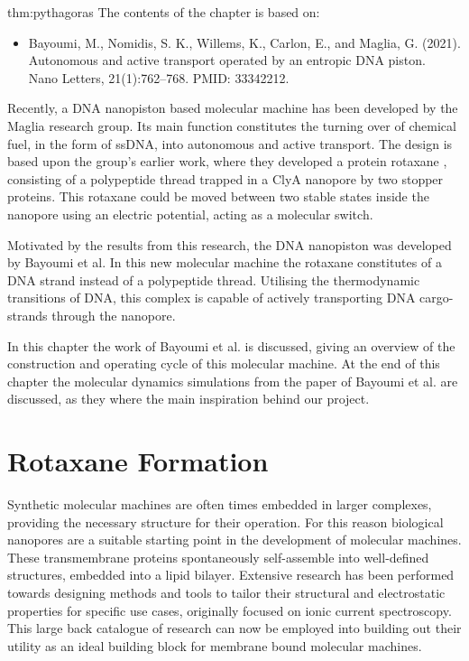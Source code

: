 
\begin{theo}{thm:pythagoras}
  The contents of the chapter is based on:
  \vspace{-0.4cm}
  \begin{itemize}
    \item Bayoumi, M., Nomidis, S. K., Willems, K., Carlon, E., and Maglia, G. (2021).
      Autonomous and active transport operated by an entropic DNA piston.\\
      Nano Letters, 21(1):762–768. PMID: 33342212.
  \end{itemize}
  \vspace{0.3cm}
\end{theo}

Recently, a DNA nanopiston based molecular machine has been developed by the Maglia
research group. Its main function constitutes the turning over of chemical fuel, in the
form of ssDNA, into autonomous and active transport. The design is based upon the group's
earlier work, where they developed a protein rotaxane \cite{Biesemans2015}, consisting of
a polypeptide thread trapped in
a ClyA nanopore by two stopper proteins. This rotaxane could be moved between two stable
states inside the nanopore using an electric potential, acting as a molecular switch.

Motivated by the results from this research, the DNA nanopiston was developed by Bayoumi
et al. In this new molecular machine the rotaxane constitutes of
a DNA strand instead of a polypeptide thread. Utilising the thermodynamic transitions of
DNA, this complex is capable of actively transporting DNA cargo-strands through the
nanopore.

In this chapter the work of Bayoumi et al. is discussed, giving an overview of the
construction and operating cycle of this molecular machine.  At the end of this chapter
the molecular dynamics simulations from the paper of Bayoumi et al. are discussed, as
they where the main inspiration behind our project.

\section{Rotaxane Formation}

Synthetic molecular machines are often times embedded in larger complexes, providing the
necessary structure for their operation. For this reason biological nanopores are a
suitable starting point in the development of molecular machines. These transmembrane
proteins spontaneously self-assemble into well-defined structures, embedded into a lipid
bilayer. Extensive research has been performed towards designing methods and tools to
tailor their structural and electrostatic properties for specific use cases, originally
focused on ionic current spectroscopy. This large back catalogue of research can now be
employed into building out their utility as an ideal building block for membrane bound
molecular machines.

